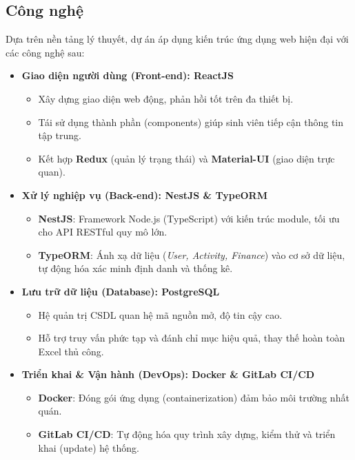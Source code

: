 \subsection{Công nghệ} Dựa trên nền tảng lý thuyết, dự án áp dụng kiến trúc ứng dụng web hiện đại với các công nghệ sau:

\begin{itemize} \item \textbf{Giao diện người dùng (Front-end): ReactJS} \begin{itemize} \item Xây dựng giao diện web động, phản hồi tốt trên đa thiết bị. \item Tái sử dụng thành phần (components) giúp sinh viên tiếp cận thông tin tập trung. \item Kết hợp \textbf{Redux} (quản lý trạng thái) và \textbf{Material-UI} (giao diện trực quan). \end{itemize}

\item \textbf{Xử lý nghiệp vụ (Back-end): NestJS \& TypeORM}
\begin{itemize}
    \item \textbf{NestJS}: Framework Node.js (TypeScript) với kiến trúc module, tối ưu cho API RESTful quy mô lớn.
    \item \textbf{TypeORM}: Ánh xạ dữ liệu (\textit{User, Activity, Finance}) vào cơ sở dữ liệu, tự động hóa xác minh định danh và thống kê.
\end{itemize}

\item \textbf{Lưu trữ dữ liệu (Database): PostgreSQL}
\begin{itemize}
    \item Hệ quản trị CSDL quan hệ mã nguồn mở, độ tin cậy cao.
    \item Hỗ trợ truy vấn phức tạp và đánh chỉ mục hiệu quả, thay thế hoàn toàn Excel thủ công.
\end{itemize}

\item \textbf{Triển khai \& Vận hành (DevOps): Docker \& GitLab CI/CD}
\begin{itemize}
    \item \textbf{Docker}: Đóng gói ứng dụng (containerization) đảm bảo môi trường nhất quán.
    \item \textbf{GitLab CI/CD}: Tự động hóa quy trình xây dựng, kiểm thử và triển khai (update) hệ thống.
\end{itemize}


\end{itemize}
